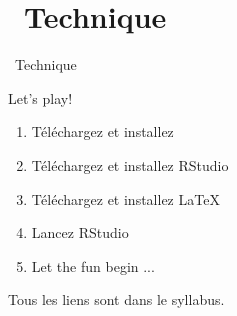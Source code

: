 \documentclass[10pt]{beamer}
\begin{document}
\section{\faLaptopCode~Technique }

\begin{frame}{\faLaptopCode~Technique}
    \begin{block}{Let's play!}
    \begin{enumerate}
        \item Téléchargez et installez \faRProject
        \item Téléchargez et installez RStudio
        \item Téléchargez et installez \LaTeX
        \item Lancez RStudio
        \item Let the fun begin ... \faMagic
    \end{enumerate}
    \alert{Tous les liens sont dans le syllabus.}
    \end{block}
\end{frame}

\maketitle
\end{document}
